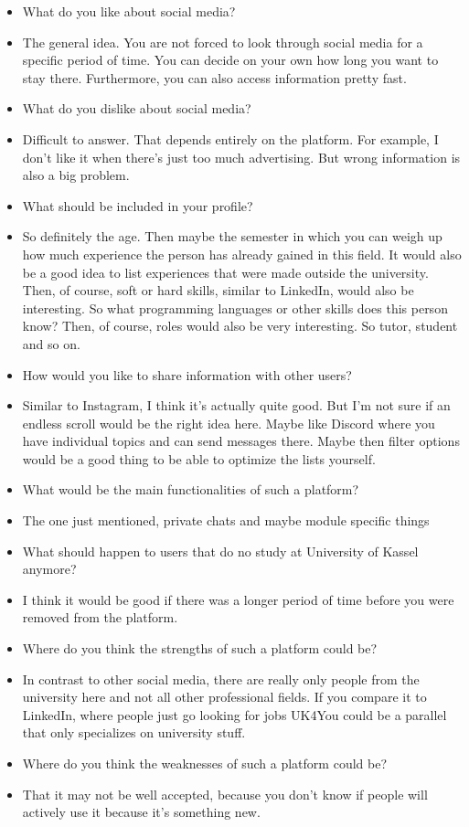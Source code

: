 {\begin{itemize}[]
    \item {} What do you like about social media?
    \item {} The general idea. You are not forced to look through social media for a specific period of time. You can decide on your own how long you want to stay there. Furthermore, you can also access information pretty fast.
    \item {} What do you dislike about social media?
    \item {} Difficult to answer. That depends entirely on the platform. For example, I don't like it when there's just too much advertising. But wrong information is also a big problem.
    \item {} What should be included in your profile?
    \item {} So definitely the age. Then maybe the semester in which you can weigh up how much experience the person has already gained in this field. It would also be a good idea to list experiences that were made outside the university. Then, of course, soft or hard skills, similar to LinkedIn, would also be interesting. So what programming languages or other skills does this person know? Then, of course, roles would also be very interesting. So tutor, student and so on.
    \item {} How would you like to share information with other users?
    \item {} Similar to Instagram, I think it's actually quite good. But I'm not sure if an endless scroll would be the right idea here. Maybe like Discord where you have individual topics and can send messages there. Maybe then filter options would be a good thing to be able to optimize the lists yourself.
    \item {} What would be the main functionalities of such a platform?
    \item {} The one just mentioned, private chats and maybe module specific things
    \item {} What should happen to users that do no study at University of Kassel anymore?
    \item {} I think it would be good if there was a longer period of time before you were removed from the platform.
    \item {} Where do you think the strengths of such a platform could be?
    \item {} In contrast to other social media, there are really only people from the university here and not all other professional fields. If you compare it to LinkedIn, where people just go looking for jobs UK4You could be a parallel that only specializes on university stuff.
    \item {} Where do you think the weaknesses of such a platform could be?
    \item {} That it may not be well accepted, because you don't know if people will actively use it because it's something new.
\end{itemize}}
\nolinenumbers
